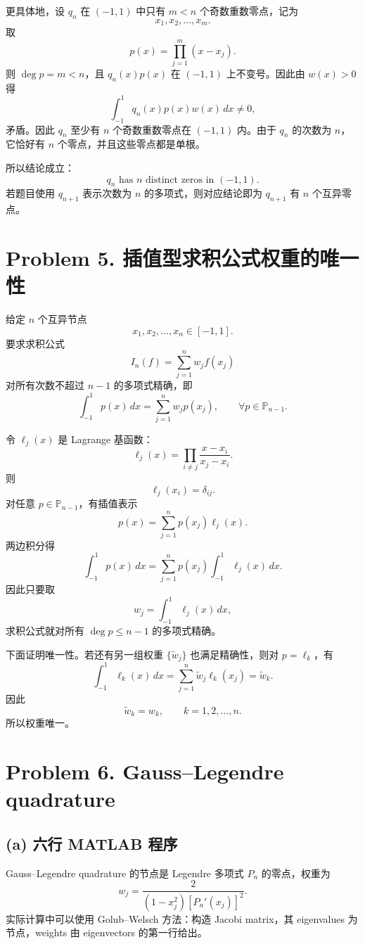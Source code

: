 \documentclass[11pt]{ctexart}
\begin{document}
更具体地，设 $q_n$ 在 $(-1,1)$ 中只有 $m<n$ 个奇数重数零点，记为
\[
x_1,x_2,\ldots,x_m.
\]
取
\[
p(x)=\prod_{j=1}^m (x-x_j).
\]
则 $\deg p=m<n$，且 $q_n(x)p(x)$ 在 $(-1,1)$ 上不变号。因此由 $w(x)>0$ 得
\[
\int_{-1}^1 q_n(x)p(x)w(x)\,dx\ne0,
\]
矛盾。因此 $q_n$ 至少有 $n$ 个奇数重数零点在 $(-1,1)$ 内。由于 $q_n$ 的次数为 $n$，它恰好有 $n$ 个零点，并且这些零点都是单根。

所以结论成立：
\[
q_n \text{ has } n \text{ distinct zeros in }(-1,1).
\]
若题目使用 $q_{n+1}$ 表示次数为 $n$ 的多项式，则对应结论即为 $q_{n+1}$ 有 $n$ 个互异零点。

\section*{Problem 5. 插值型求积公式权重的唯一性}

给定 $n$ 个互异节点
\[
x_1,x_2,\ldots,x_n\in[-1,1].
\]
要求求积公式
\[
I_n(f)=\sum_{j=1}^n w_j f(x_j)
\]
对所有次数不超过 $n-1$ 的多项式精确，即
\[
\int_{-1}^1 p(x)\,dx=\sum_{j=1}^n w_jp(x_j),
\qquad \forall p\in\mathbb{P}_{n-1}.
\]

令 $\ell_j(x)$ 是 Lagrange 基函数：
\[
\ell_j(x)=\prod_{i\ne j}\frac{x-x_i}{x_j-x_i}.
\]
则
\[
\ell_j(x_i)=\delta_{ij}.
\]
对任意 $p\in\mathbb{P}_{n-1}$，有插值表示
\[
p(x)=\sum_{j=1}^n p(x_j)\ell_j(x).
\]
两边积分得
\[
\int_{-1}^1 p(x)\,dx
=
\sum_{j=1}^n p(x_j)\int_{-1}^1\ell_j(x)\,dx.
\]
因此只要取
\[
w_j=\int_{-1}^1\ell_j(x)\,dx,
\]
求积公式就对所有 $\deg p\le n-1$ 的多项式精确。

下面证明唯一性。若还有另一组权重 $\{\tilde w_j\}$ 也满足精确性，则对 $p=\ell_k$，有
\[
\int_{-1}^1\ell_k(x)\,dx
=
\sum_{j=1}^n \tilde w_j\ell_k(x_j)
=
\tilde w_k.
\]
因此
\[
\tilde w_k=w_k,
\qquad k=1,2,\ldots,n.
\]
所以权重唯一。

\section*{Problem 6. Gauss--Legendre quadrature}

\subsection*{(a) 六行 MATLAB 程序}

Gauss--Legendre quadrature 的节点是 Legendre 多项式 $P_n$ 的零点，权重为
\[
w_j=\frac{2}{(1-x_j^2)[P_n'(x_j)]^2}.
\]
实际计算中可以使用 Golub--Welsch 方法：构造 Jacobi matrix，其 eigenvalues 为节点，weights 由 eigenvectors 的第一行给出。
\end{document}
